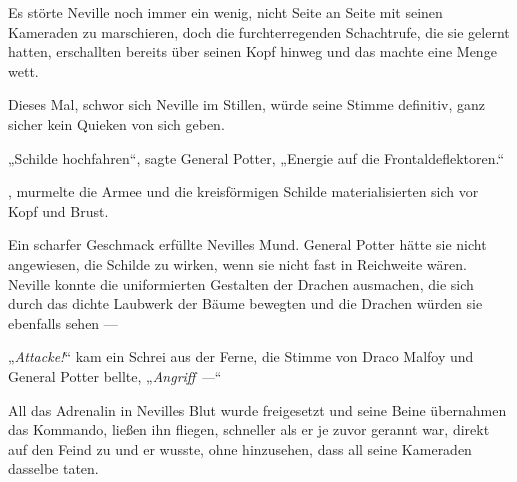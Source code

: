 Es störte Neville noch immer ein wenig, nicht Seite an Seite mit seinen Kameraden zu marschieren, doch die furchterregenden Schachtrufe, die sie gelernt hatten, erschallten bereits über seinen Kopf hinweg und das machte eine Menge wett.

Dieses Mal, schwor sich Neville im Stillen, würde seine Stimme definitiv, ganz sicher kein Quieken von sich geben.

„Schilde hochfahren“, sagte General Potter,
„Energie auf die Frontaldeflektoren.“

, murmelte die Armee und die kreisförmigen Schilde materialisierten sich vor Kopf und Brust.

Ein scharfer Geschmack erfüllte Nevilles Mund. General Potter hätte sie nicht angewiesen, die Schilde zu wirken, wenn sie nicht fast in Reichweite wären. Neville konnte die uniformierten Gestalten der Drachen ausmachen, die sich durch das dichte Laubwerk der Bäume bewegten und die Drachen würden sie ebenfalls sehen —

„\emph{Attacke!}“ kam ein Schrei aus der Ferne, die Stimme von Draco Malfoy und General Potter bellte,
„\emph{Angriff —}“

All das Adrenalin in Nevilles Blut wurde freigesetzt und seine Beine übernahmen das Kommando, ließen ihn fliegen, schneller als er je zuvor gerannt war, direkt auf den Feind zu und er wusste, ohne hinzusehen, dass all seine Kameraden dasselbe taten.

